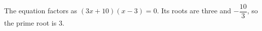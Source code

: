 The equation factors as $(3x+10)(x-3)=0$. Its roots are three and $-\dfrac{10}{3}$, so the prime root is $\boxed3$.
